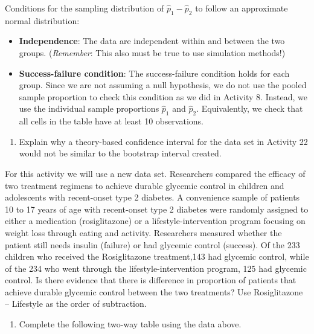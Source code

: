 \documentclass[
]{report}
\providecommand{\tightlist}{%
  \setlength{\itemsep}{0pt}\setlength{\parskip}{0pt}}
\begin{document}
Conditions for the sampling distribution of \(\hat{p}_1-\hat{p}_2\) to follow an approximate normal distribution:

\begin{itemize}
\item
  \textbf{Independence}: The data are independent within and between the two groups. (\emph{Remember}: This also must be true to use simulation methods!)
\item
  \textbf{Success-failure condition}: The success-failure condition holds for each group. Since we are not assuming a null hypothesis, we do not use the pooled sample proportion to check this condition as we did in Activity 8. Instead, we use the individual sample proportions \(\hat{p}_1\) and \(\hat{p}_2\). Equivalently, we check that all cells in the table have at least 10 observations.
\end{itemize}

\begin{enumerate}
\def\labelenumi{\arabic{enumi}.}
\tightlist
\item
  Explain why a theory-based confidence interval for the data set in Activity 22 would not be similar to the bootstrap interval created.
\end{enumerate}

\vspace{1in}

For this activity we will use a new data set. Researchers compared the efficacy of two treatment regimens to achieve durable glycemic control in children and adolescents with recent-onset type 2 diabetes. A convenience sample of patients 10 to 17 years of age with recent-onset type 2 diabetes were randomly assigned to either a medication (rosiglitazone) or a lifestyle-intervention program focusing on weight loss through eating and activity. Researchers measured whether the patient still needs insulin (failure) or had glycemic control (success). Of the 233 children who received the Rosiglitazone treatment,143 had glycemic control, while of the 234 who went through the lifestyle-intervention program, 125 had glycemic control. Is there evidence that there is difference in proportion of patients that achieve durable glycemic control between the two treatments? Use Rosiglitazone -- Lifestyle as the order of subtraction.

\begin{enumerate}
\def\labelenumi{\arabic{enumi}.}
\setcounter{enumi}{1}
\tightlist
\item
  Complete the following two-way table using the data above.
\end{enumerate}
\end{document}
